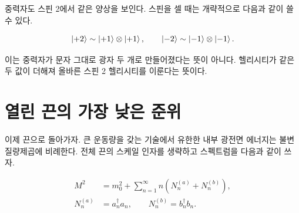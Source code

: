 중력자도 스핀 2에서 같은 양상을 보인다. 스핀을 셀 때는 개략적으로 다음과 같이 쓸 수 있다.

\begin{equation}
  \left\lvert+2\right\rangle\sim\left\lvert+1\right\rangle\otimes\left\lvert+1\right\rangle,
  \qquad
  \left\lvert-2\right\rangle\sim\left\lvert-1\right\rangle\otimes\left\lvert-1\right\rangle.
  \label{eq:l03-graviton-helicity}
\end{equation}

이는 중력자가 문자 그대로 광자 두 개로 만들어졌다는 뜻이 아니다. 헬리시티가 같은 두 값이 더해져 올바른 스핀 2 헬리시티를 이룬다는 뜻이다.

\begin{classroomqa}\end{classroomqa}

\begin{classroomqa}\end{classroomqa}

\section{열린 끈의 가장 낮은 준위}

이제 끈으로 돌아가자. 큰 운동량을 갖는 기술에서 유한한 내부 광전면 에너지는 불변 질량제곱에 비례한다. 전체 끈의 스케일 인자를 생략하고 스펙트럼을 다음과 같이 쓰자.

\begin{equation}
  \begin{aligned}
    M^2
    &=m_0^2
      +\sum_{n=1}^{\infty}n
       \left(N_n^{(a)}+N_n^{(b)}\right),\\
    N_n^{(a)}&=a_n^\dagger a_n,
    \qquad
    N_n^{(b)}=b_n^\dagger b_n.
  \end{aligned}
  \label{eq:l03-open-spectrum}
\end{equation}

